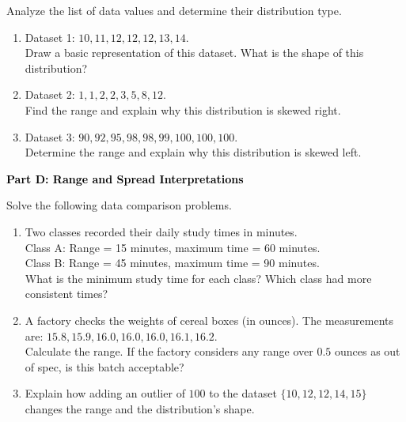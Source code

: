 \documentclass[12pt, letterpaper, fleqn]{article}
\begin{document}
\vspace{3mm}

\noindent
Analyze the list of data values and determine their distribution type.

\vspace{5mm}

\begin{enumerate}[itemsep=4cm, leftmargin=0.6cm]
\item Dataset 1: $10, 11, 12, 12, 12, 13, 14$. \\
Draw a basic representation of this dataset. What is the shape of this distribution?
\vspace{1cm}

\item Dataset 2: $1, 1, 2, 2, 3, 5, 8, 12$. \\
Find the range and explain why this distribution is skewed right.
\vspace{1cm}

\item Dataset 3: $90, 92, 95, 98, 98, 99, 100, 100, 100$. \\
Determine the range and explain why this distribution is skewed left.
\end{enumerate}

\newpage

\begin{tcolorbox}[colback=black!10]
    \large\textcolor{black}{\textbf{Part D: Range and Spread Interpretations}}
\end{tcolorbox}

\vspace{3mm}

\noindent
Solve the following data comparison problems.

\vspace{5mm}

\begin{enumerate}[itemsep=2.5cm, leftmargin=0.6cm]
\item Two classes recorded their daily study times in minutes. \\
Class A: Range = 15 minutes, maximum time = 60 minutes. \\
Class B: Range = 45 minutes, maximum time = 90 minutes. \\
What is the minimum study time for each class? Which class had more consistent times?
\vspace{1cm}

\item A factory checks the weights of cereal boxes (in ounces). The measurements are: $15.8, 15.9, 16.0, 16.0, 16.0, 16.1, 16.2$. \\
Calculate the range. If the factory considers any range over $0.5$ ounces as out of spec, is this batch acceptable?
\vspace{1cm}

\item Explain how adding an outlier of $100$ to the dataset $\{10, 12, 12, 14, 15\}$ changes the range and the distribution's shape.
\end{enumerate}
\end{document}
